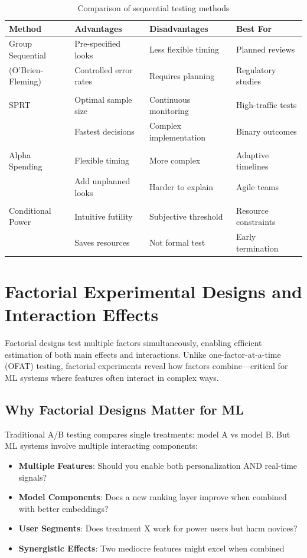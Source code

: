 \begin{table}[h]
\centering
\begin{tabular}{llll}
\toprule
\textbf{Method} & \textbf{Advantages} & \textbf{Disadvantages} & \textbf{Best For} \\
\midrule
Group Sequential & Pre-specified looks & Less flexible timing & Planned reviews \\
(O'Brien-Fleming) & Controlled error rates & Requires planning & Regulatory studies \\
\\
SPRT & Optimal sample size & Continuous monitoring & High-traffic tests \\
& Fastest decisions & Complex implementation & Binary outcomes \\
\\
Alpha Spending & Flexible timing & More complex & Adaptive timelines \\
& Add unplanned looks & Harder to explain & Agile teams \\
\\
Conditional Power & Intuitive futility & Subjective threshold & Resource constraints \\
& Saves resources & Not formal test & Early termination \\
\bottomrule
\end{tabular}
\caption{Comparison of sequential testing methods}
\end{table}

\section{Factorial Experimental Designs and Interaction Effects}

Factorial designs test multiple factors simultaneously, enabling efficient estimation of both main effects and interactions. Unlike one-factor-at-a-time (OFAT) testing, factorial experiments reveal how factors combine---critical for ML systems where features often interact in complex ways.

\subsection{Why Factorial Designs Matter for ML}

Traditional A/B testing compares single treatments: model A vs model B. But ML systems involve multiple interacting components:

\begin{itemize}
    \item \textbf{Multiple Features}: Should you enable both personalization AND real-time signals?
    \item \textbf{Model Components}: Does a new ranking layer improve when combined with better embeddings?
    \item \textbf{User Segments}: Does treatment X work for power users but harm novices?
    \item \textbf{Synergistic Effects}: Two mediocre features might excel when combined
\end{itemize}

